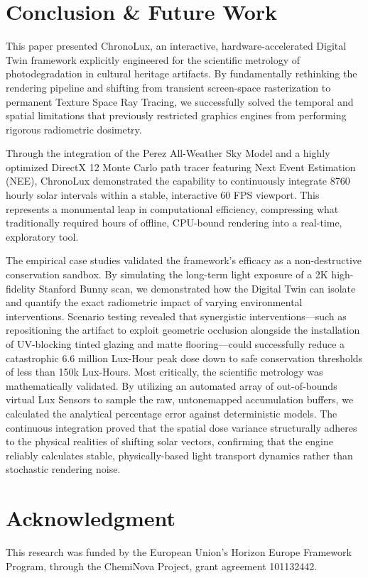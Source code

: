 \documentclass[conference]{IEEEtran}
\begin{document}
\section{Conclusion \& Future Work}
This paper presented ChronoLux, an interactive, hardware-accelerated Digital Twin framework explicitly engineered for the scientific metrology of photodegradation in cultural heritage artifacts. By fundamentally rethinking the rendering pipeline and shifting from transient screen-space rasterization to permanent Texture Space Ray Tracing, we successfully solved the temporal and spatial limitations that previously restricted graphics engines from performing rigorous radiometric dosimetry.

Through the integration of the Perez All-Weather Sky Model and a highly optimized DirectX 12 Monte Carlo path tracer featuring Next Event Estimation (NEE), ChronoLux demonstrated the capability to continuously integrate 8760 hourly solar intervals within a stable, interactive 60 FPS viewport. This represents a monumental leap in computational efficiency, compressing what traditionally required hours of offline, CPU-bound rendering into a real-time, exploratory tool.

The empirical case studies validated the framework's efficacy as a non-destructive conservation sandbox. By simulating the long-term light exposure of a 2K high-fidelity Stanford Bunny scan, we demonstrated how the Digital Twin can isolate and quantify the exact radiometric impact of varying environmental interventions. Scenario testing revealed that synergistic interventions---such as repositioning the artifact to exploit geometric occlusion alongside the installation of UV-blocking tinted glazing and matte flooring---could successfully reduce a catastrophic 6.6 million Lux-Hour peak dose down to safe conservation thresholds of less than 150k Lux-Hours. Most critically, the scientific metrology was mathematically validated. By utilizing an automated array of out-of-bounds virtual Lux Sensors to sample the raw, untonemapped accumulation buffers, we calculated the analytical percentage error against deterministic models. The continuous integration proved that the spatial dose variance structurally adheres to the physical realities of shifting solar vectors, confirming that the engine reliably calculates stable, physically-based light transport dynamics rather than stochastic rendering noise.

\section*{Acknowledgment}
This research was funded by the European Union's Horizon Europe Framework Program, through the ChemiNova Project, grant agreement 101132442.



\end{document}
